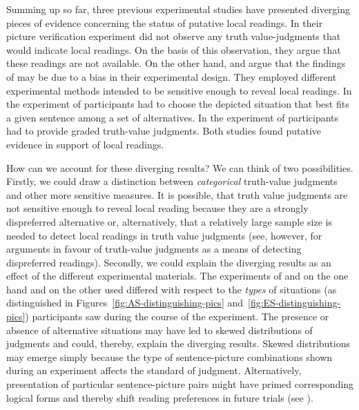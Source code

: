 \documentclass[fleqn,reqno,10pt,draft]{article}
\begin{document}
Summing up so far, three previous experimental studies have presented diverging
pieces of evidence concerning the status of putative local
readings. In their picture verification experiment
\citet{GeurtsPouscoulous2009:Embedded-Implic} did not observe any
truth value-judgments that would indicate local readings. On the basis
of this observation, they argue that these readings are not
available. On the other hand,
\citeauthor{CliftonDube2010:Embedded-Implic} and
\citeauthor{ChemlaSpector2010:Experimental-Ev} argue that the findings
of \citeauthor{GeurtsPouscoulous2009:Embedded-Implic} may be due to a
bias in their experimental design. They employed different experimental methods
intended to be sensitive enough to reveal local readings. In the experiment of \citeauthor{CliftonDube2010:Embedded-Implic}
 participants had to choose the depicted situation that best fits a given
sentence among a set of alternatives. In the experiment of \citeauthor{ChemlaSpector2010:Experimental-Ev}  participants
had to provide graded truth-value judgments. Both studies found
putative evidence in support of local readings.

How can we account for these diverging results? We can think of two possibilities.
Firstly, we could draw a distinction between \emph{categorical} truth-value judgments
and other more sensitive measures. It is possible, that truth value judgments are not sensitive enough
to reveal local reading because they are a strongly dispreferred alternative or, alternatively,
that a relatively large sample size is needed to detect local readings in truth value judgments (see, however, \citet{Crain1998} for arguments in favour of truth-value judgments as a means of detecting
dispreferred readings). Secondly, we could explain the diverging results as
an effect of the different experimental materials. The experiments of
\citeauthor{CliftonDube2010:Embedded-Implic} and
\citeauthor{ChemlaSpector2010:Experimental-Ev} on the one hand and
\citet{GeurtsPouscoulous2009:Embedded-Implic} on the other used differed
with respect to the \emph{types} of situations (as distinguished in Figures~\ref{fig:AS-distinguishing-pics}
and~\ref{fig:ES-distinguishing-pics}) participants saw during the course
of the experiment. The presence or absence of alternative situations may
have led to skewed distributions of judgments and could, thereby, explain the diverging results.
Skewed distributions may emerge simply because the type of sentence-picture
combinations shown during an experiment affects the standard of
judgment. Alternatively, presentation of  particular sentence-picture pairs might have
primed corresponding logical forms and thereby shift reading preferences in future trials
(see \citet{Raffray2010}).  
\end{document}
